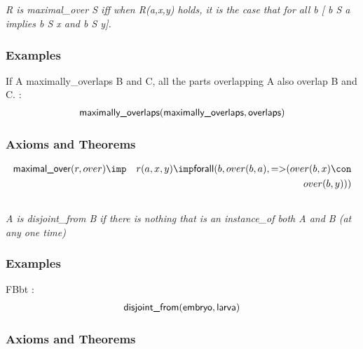 \subsection{ }
\emph{R is maximal\_over S iff when R(a,x,y) holds, it is the case that for all b [ b S a implies b S x and b S y].}

\subsubsection{Examples}
\begin{clist}
\item If A maximally\_overlaps B and C, all the parts overlapping A also overlap B and C. : \begin{eqnarray*}
 \mbox{\sf maximally\_overlaps}( \mbox{\sf maximally\_overlaps},  \mbox{\sf overlaps}) 
\end{eqnarray*}

\end{clist}

\subsubsection{Axioms and Theorems}


\begin{eqnarray*}
 \pr{maximal\_over}(r, over) &\imp &r(a, x, y) \imp  \pr{forall}(b, over(b, a) ,  \pr{=>}(over(b, x) \con \\
&&over(b, y) ) ) 
\end{eqnarray*}

\subsection{ }
\emph{A is disjoint\_from B if there is nothing that is an instance\_of both A and B (at any one time)}

\subsubsection{Examples}
\begin{clist}
\item FBbt : \begin{eqnarray*}
 \mbox{\sf disjoint\_from}( \mbox{\sf embryo},  \mbox{\sf larva}) 
\end{eqnarray*}

\end{clist}

\subsubsection{Axioms and Theorems}

